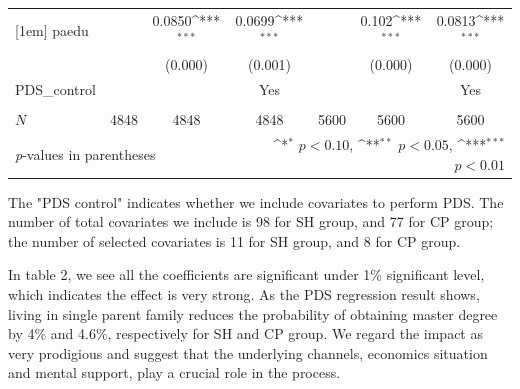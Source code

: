 \documentclass[]{AEA}
\def\sym#1{\ifmmode^{#1}\else\(^{#1}\)\fi}
\begin{document}
\begin{center}
\begin{table}
\begin{tabular}{l*{6}c}
    [1em]
    paedu       &                     &      0.0850\sym{***}&      0.0699\sym{***}&                     &       0.102\sym{***}&      0.0813\sym{***}\\
        &                     &     (0.000)         &     (0.001)         &                     &     (0.000)         &     (0.000)         \\
    [1em]
    PDS\_control  &   &  &  Yes    &  &    &  Yes \\
    &   &      &      &   &      &      \\
    \hline
    \(N\)       &        4848         &        4848         &        4848         &        5600         &        5600         &        5600         \\
    \bottomrule
    \multicolumn{3}{l}{\footnotesize \textit{p}-values in parentheses} & \multicolumn{4}{r}{\footnotesize \sym{*} \(p<0.10\), \sym{**} \(p<0.05\), \sym{***} \(p<0.01\)}\\
    \end{tabular}
    \begin{tablenotes}
        The "PDS control" indicates whether we include covariates to perform PDS.  The number of total covariates we include is 98 for SH group, and 77 for CP group; the number of selected covariates is 11 for SH group, and 8 for CP group.
    \end{tablenotes}
    \end{table}
    \end{center}

    In table 2, we see all the coefficients are significant under 1\% significant level, which indicates the effect is very strong.  As the PDS regression result shows, living in single parent family reduces the probability of obtaining master degree by 4\% and 4.6\%, respectively for SH and CP group.  We regard the impact as very prodigious and suggest that the underlying channels, economics situation and mental support, play a crucial role in the process.
\end{document}
